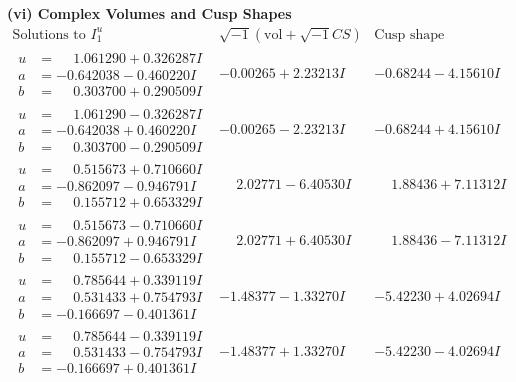 \documentclass[1p]{elsarticle_modified}
\theoremstyle{definition}
\newcommand{\I}{\sqrt{-1}}
\begin{document}
\newpage\flushleft \textbf{(vi) Complex Volumes and Cusp Shapes}
$$\begin{array}{c|c|c}  
\text{Solutions to }I^u_{1}& \I (\text{vol} + \sqrt{-1}CS) & \text{Cusp shape}\\
 \hline 
\begin{aligned}
u &= \phantom{-}1.061290 + 0.326287 I \\
a &= -0.642038 - 0.460220 I \\
b &= \phantom{-}0.303700 + 0.290509 I\end{aligned}
 & -0.00265 + 2.23213 I & -0.68244 - 4.15610 I \\ \hline\begin{aligned}
u &= \phantom{-}1.061290 - 0.326287 I \\
a &= -0.642038 + 0.460220 I \\
b &= \phantom{-}0.303700 - 0.290509 I\end{aligned}
 & -0.00265 - 2.23213 I & -0.68244 + 4.15610 I \\ \hline\begin{aligned}
u &= \phantom{-}0.515673 + 0.710660 I \\
a &= -0.862097 - 0.946791 I \\
b &= \phantom{-}0.155712 + 0.653329 I\end{aligned}
 & \phantom{-}2.02771 - 6.40530 I & \phantom{-}1.88436 + 7.11312 I \\ \hline\begin{aligned}
u &= \phantom{-}0.515673 - 0.710660 I \\
a &= -0.862097 + 0.946791 I \\
b &= \phantom{-}0.155712 - 0.653329 I\end{aligned}
 & \phantom{-}2.02771 + 6.40530 I & \phantom{-}1.88436 - 7.11312 I \\ \hline\begin{aligned}
u &= \phantom{-}0.785644 + 0.339119 I \\
a &= \phantom{-}0.531433 + 0.754793 I \\
b &= -0.166697 - 0.401361 I\end{aligned}
 & -1.48377 - 1.33270 I & -5.42230 + 4.02694 I \\ \hline\begin{aligned}
u &= \phantom{-}0.785644 - 0.339119 I \\
a &= \phantom{-}0.531433 - 0.754793 I \\
b &= -0.166697 + 0.401361 I\end{aligned}
 & -1.48377 + 1.33270 I & -5.42230 - 4.02694 I \\ \hline\begin{aligned}

\end{aligned}
\end{array}$$
\end{document}
